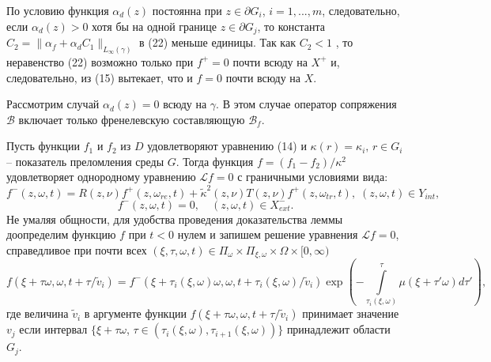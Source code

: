 \documentclass[12pt,reqno]{report}
\begin{document}
По условию функция $\alpha_d(z)$  постоянна при $z\in \partial G_i$, $i=1,...,m$, следовательно, если $\alpha_d(z)>0$ хотя бы на одной границе $z\in \partial G_j$, то  константа $C_2= \|\alpha_f  +\alpha_d C_1 \|_{L_{\infty}(\gamma)}$ в (22) меньше единицы. Так как $C_2<1$ , то неравенство (22) возможно только при  $f^+=0$ почти всюду на $X^+$ и, следовательно,  из (15) вытекает, что и $f=0$  почти всюду на $X$. 

Рассмотрим случай $\alpha_d(z)=0$ всюду на $\gamma$. В этом случае оператор сопряжения $\mathcal B$ включает только  френелевскую составляющую  $\mathcal B_f$.

Пусть функции $f_1$ и $f_2$ из $D$
удовлетворяют уравнению (14) и $\kappa(r)=\kappa_i,\,r \in G_i$ --
показатель преломления среды $G$. Тогда функция
$f=(f_1-f_2)/\kappa^2$ удовлетворяет однородному уравнению
${\mathcal L} f=0$ с граничными условиями вида:
\begin{equation}
f^-(z,\omega,t)=R (z,\nu) f^+(z,\omega_{re},t) +
\widetilde{\kappa}^2(z,\nu) T(z,\nu) f^+(z,\omega_{tr},t), \;
(z,\omega,t) \in Y_{int},
\end{equation}
\begin{equation}
f^-(z,\omega,t)=0, \quad (z,\omega,t) \in X^-_{ext}.
\end{equation}
Не умаляя общности, для удобства
проведения доказательства леммы доопределим функцию $f$ при $t<0$
нулем и запишем решение уравнения ${\mathcal L}f=0$, справедливое при
почти всех $(\xi,\tau,\omega,t) \in \Pi_{\omega} \times
\Pi_{\xi,\omega} \times \Omega \times [0,\infty)$
$$
f(\xi+\tau\omega,\omega,t+\tau/\tilde{v}_i)=f^-(\xi+\tau_i (\xi,\omega)
\omega,\omega, t+\tau_i (\xi,\omega)/\tilde{v}_i) \exp \left ( - \int
\limits^{\tau}_{\tau_i(\xi,\omega)} \mu(\xi+\tau'\omega) d\tau'
\right ),
$$
где величина $\tilde{v}_i$ в аргументе функции  $f(\xi+\tau\omega,\omega,t+\tau/\tilde{v}_i)$ принимает значение $v_j$ если
интервал $\{\xi+\tau\omega$, $\tau\in (\tau_i(\xi,\omega), \tau_{i+1}(\xi,\omega))\}$ принадлежит области $G_j$. 
\end{document}
